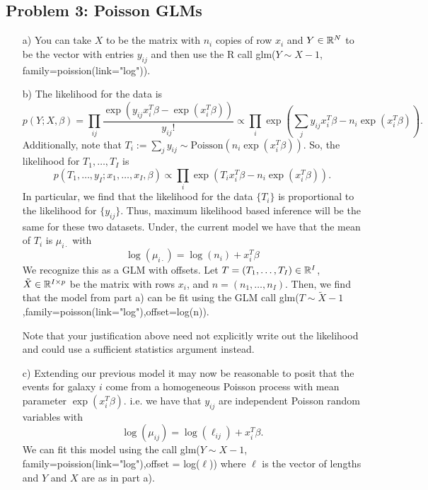 \subsection*{Problem 3: Poisson GLMs}

\begin{enumerate}
\item[a)]
You can take $X$ to be the matrix with $n_i$ copies of row $x_i$ and $Y \in \mathbb{R}^{N}$ to be the vector with entries $y_{ij}$ and then use the R call glm($Y \sim X-1$, family=poission(link="log")).
\item[b)]
The likelihood for the data is 
\[
p(Y;X,\beta) = \prod_{ij} \frac{ \exp( y_{ij} x_i^T\beta - \exp(x_i^T\beta )) }{y_{ij}!} \propto \prod_i \exp(\sum_{j} y_{ij} x_i^T\beta - n_i\exp(x_i^T\beta)). 
\]
Additionally, note that $T_{i} := \sum_{j} y_{ij} \sim \text{Poisson}(n_i\exp(x_i^T\beta))$. So, the likelihood for $T_{1},\dots,T_{I}$ is 
\[
p(T_{1},\dots,y_{I};x_1,\dots,x_I,\beta) \propto \prod_i \exp(T_{i} x_i^T\beta - n_i\exp(x_i^T\beta)).
\]
In particular, we find that the likelihood for the data  $\{T_{i}\}$ is proportional to the likelihood for $\{y_{ij}\}$. Thus, maximum likelihood based inference will be the same for these two datasets.  Under, the current model we have that the mean of $T_{i}$ is $\mu_{i\cdot}$ with 
\[
\log(\mu_{i\cdot}) = \log(n_i) + x_i^T\beta
\] 
We recognize this as a GLM with offsets. Let $T =(T_1,\dots,T_I) \in \mathbb{R}^I$, $\tilde{X} \in \mathbb{R}^{I \times p}$ be the matrix with rows $x_i$, and $n = (n_1,\dots,n_I)$. Then, we find that the model from part a) can be fit using the GLM call glm($T \sim \tilde{X} - 1$,family=poisson(link="log"),offset=log(n)).

Note that your justification above need not explicitly write out the likelihood and could use a sufficient statistics argument instead. %
\item[c)]
Extending our previous model it may now be reasonable to posit that the events for galaxy $i$ come from a homogeneous Poisson process with mean parameter $\exp(x_i^T\beta)$. i.e. we have that $y_{ij}$ are independent Poisson random variables with  
\[
\log(\mu_{ij}) = \log(\ell_{ij}) + x_i^T\beta. 
\]
We can fit this model using the call glm($Y \sim X-1$, family=poission(link="log"),offset = log($\ell$)) where $\ell$ is the vector of lengths and $Y$ and $X$ are as in part a).
\end{enumerate}

